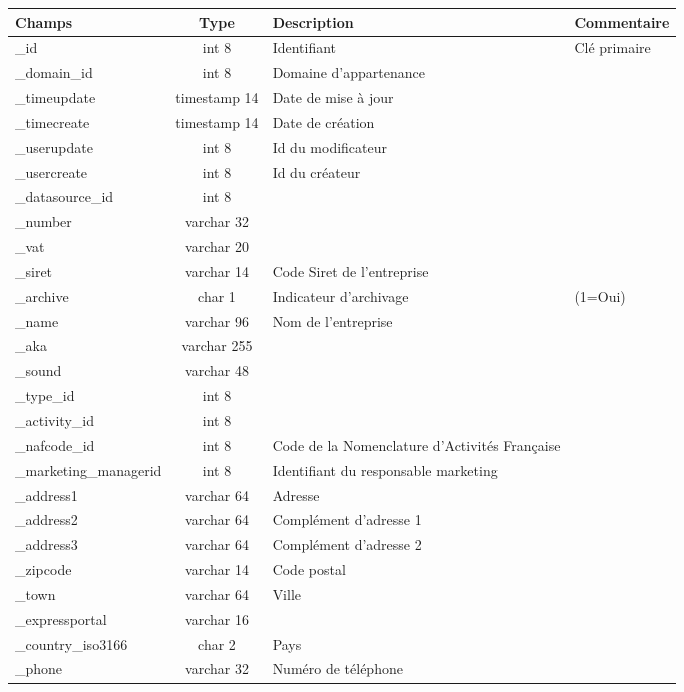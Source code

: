 \begin{tabular}{|p{3cm}|c|p{5.4cm}|p{2.6cm}|}
\hline
\textbf{Champs} & \textbf{Type} & \textbf{Description} & \textbf{Commentaire} \\
\hline
\_id & int 8 & Identifiant & Clé primaire \\
\hline
\_domain\_id & int 8 & Domaine d'appartenance & \\
\hline
\_timeupdate & timestamp 14 & Date de mise à jour & \\
\hline
\_timecreate & timestamp 14 & Date de création & \\
\hline
\_userupdate & int 8 & Id du modificateur & \\
\hline
\_usercreate & int 8 & Id du créateur & \\
\hline
\_datasource\_id & int 8 &  & \\
\hline
\_number & varchar 32 &  & \\
\hline
\_vat & varchar 20 &  & \\
\hline
\_siret & varchar 14  & Code Siret de l'entreprise & \\
\hline
\_archive & char 1 & Indicateur d'archivage & (1=Oui) \\
\hline
\_name & varchar 96 &  Nom de l'entreprise &  \\
\hline
\_aka & varchar 255  &  & \\
\hline
\_sound & varchar 48  &  & \\
\hline
\_type\_id & int 8  &  & \\
\hline
\_activity\_id & int 8 &  & \\
\hline
\_nafcode\_id & int 8  & Code de la Nomenclature d'Activités Française & \\
\hline
\_marketing\_managerid & int 8  & Identifiant du responsable marketing  & \\
\hline
\_address1 & varchar 64 & Adresse  & \\
\hline
\_address2 & varchar 64 & Complément d'adresse 1 & \\
\hline
\_address3 & varchar 64  & Complément d'adresse 2  & \\
\hline
\_zipcode & varchar 14 & Code postal  & \\
\hline
\_town & varchar 64 & Ville & \\
\hline
\_expressportal & varchar 16 &  & \\
\hline
\_country\_iso3166 & char 2 & Pays   & \\
\hline
\_phone & varchar 32 & Numéro de téléphone & \\

\end{tabular}

